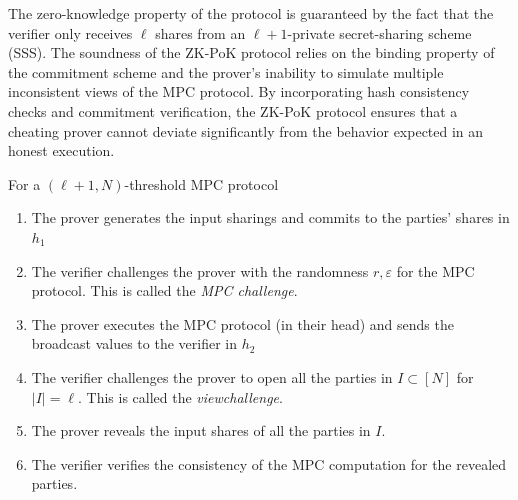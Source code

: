 \documentclass[11pt]{report}
\theoremstyle{definition}
\theoremstyle{plain}
\begin{document}
The zero-knowledge property of the protocol is guaranteed by the fact that the verifier only receives $\ell$ shares from an $\ell + 1$-private secret-sharing scheme (SSS).
The soundness of the ZK-PoK protocol relies on the binding property of the commitment scheme and the prover's inability to simulate multiple inconsistent views of the MPC protocol. By incorporating hash consistency checks and commitment verification, the ZK-PoK protocol ensures that a cheating prover cannot deviate significantly from the behavior expected in an honest execution.

\clearpage

\begin{protocol}
  \label{pro:sdith-zkpok}
  For a $(\ell + 1, N)$-threshold MPC protocol
  \begin{enumerate}[parsep=0pt, itemsep=0pt, topsep=0pt]
    \item The prover generates the input sharings and commits to the parties' shares in $h_1$
    \item The verifier challenges the prover with the randomness \(r, \varepsilon\) for the MPC protocol. This is called the \textit{MPC challenge}.
    \item The prover executes the MPC protocol (in their head) and sends the broadcast values to the verifier in $h_2$
    \item The verifier challenges the prover to open all the parties in \(I \subset [N]\) for $|I| = \ell$. This is called the \textit{viewchallenge}.
    \item The prover reveals the input shares of all the parties in \(I\).
    \item The verifier verifies the consistency of the MPC computation for the revealed parties.
  \end{enumerate}
\end{protocol}
\end{document}
